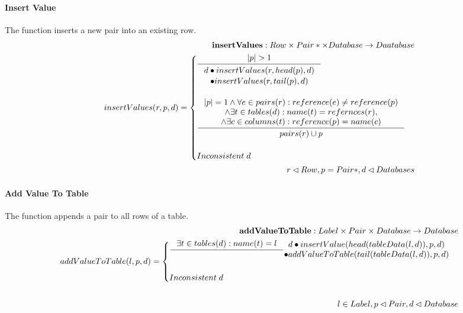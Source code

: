 \documentclass[11pt]{article}
\begin{document}
\paragraph{Insert Value} The function inserts a new pair into an existing row.
\begin{align*}
	\mathbf{insertValues} : Row \times Pair* \times Database \rightarrow Daatabase \\
	insertValues(r, p, d) = \begin{cases}
 		\inference{|p| > 1}{\begin{gathered}
			d \bullet insertValues(r, head(p), d) \\ \bullet insertValues(r, tail(p), d)
	\end{gathered}}
  \\ \\
 		\inference{|p| = 1 \wedge \forall e \in pairs(r) : reference(e) \neq reference(p) \\ \wedge \exists t \in tables(d) : name(t) = refernces(r), \\ \wedge \exists c \in columns(t) : reference(p) = name(c)}{pairs(r) \cup p} \\ \\
	 	 Inconsistent \; d
 		\end{cases} \\
r \lhd Row, p = Pair*,d \lhd Databases
\end{align*}

\paragraph{Add Value To Table} The function appends a pair to all rows of a table.
\begin{align*}
	\mathbf{addValueToTable} : Label \times Pair \times Database \rightarrow Database \\
	addValueToTable(l, p, d) = \begin{cases}
 		\inference{\exists t \in tables(d) : name(t) = l}	{\begin{gathered}
		d \bullet insertValue(head(tableData(l, d)), p, d) \\ \bullet addValueToTable(tail(tableData(l, d)), p, d)
	\end{gathered}} \\ \\
 		Inconsistent \; d
 	\end{cases}\\ \\
 	l \in Label, p \lhd Pair,  d \lhd Database
\end{align*}
\end{document}
